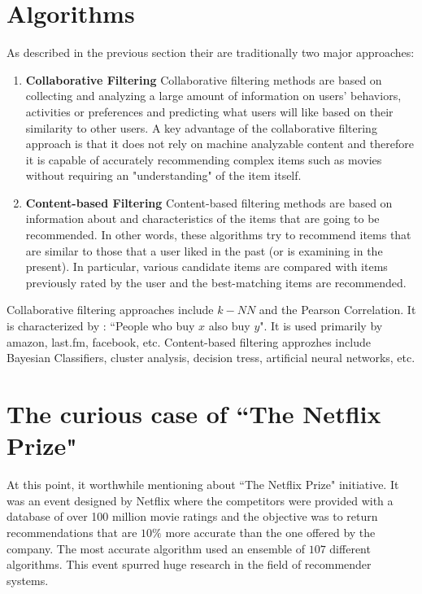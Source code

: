 \documentclass[twocolumn]{article}
\begin{document}
\section{Algorithms}
As described in the previous section their are traditionally two major approaches:
\begin{enumerate}
\item {\bf Collaborative Filtering}
Collaborative filtering methods are based on collecting and analyzing a large amount of information on users’ behaviors, activities or preferences and predicting what users will like based on their similarity to other users. A key advantage of the collaborative filtering approach is that it does not rely on machine analyzable content and therefore it is capable of accurately recommending complex items such as movies without requiring an "understanding" of the item itself.
\item{\bf Content-based Filtering}
Content-based filtering methods are based on information about and characteristics of the items that are going to be recommended. In other words, these algorithms try to recommend items that are similar to those that a user liked in the past (or is examining in the present). In particular, various candidate items are compared with items previously rated by the user and the best-matching items are recommended.
\end{enumerate}
Collaborative filtering approaches include $k-NN$ and the Pearson Correlation. It is characterized by : ``People who buy $x$ also buy $y$". It is used primarily by amazon, last.fm, facebook, etc. Content-based filtering approzhes include Bayesian Classifiers, cluster analysis, decision tress, artificial neural networks, etc.

\section{The curious case of ``The Netflix Prize"}
At this point, it worthwhile mentioning about ``The Netflix Prize" initiative. It was an event designed by Netflix where the competitors were provided with a database of over 100 million movie ratings and the objective was to return recommendations that are $10\%$ more accurate than the one offered by the company. The most accurate algorithm used an ensemble of $107$ different algorithms. This event spurred huge research in the field of recommender systems.
\end{document}
